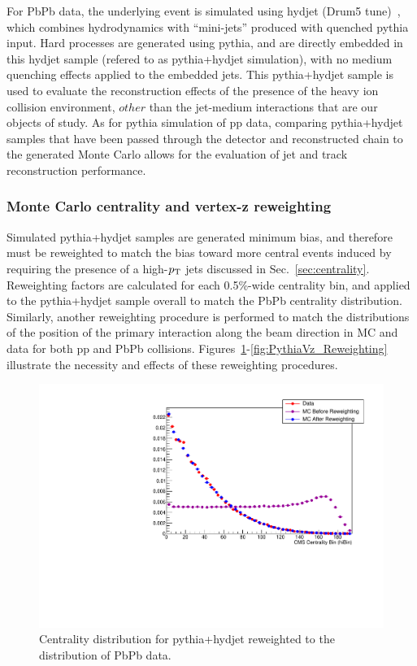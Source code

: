 For PbPb data, the underlying event is simulated using {\sc hydjet} (Drum5 tune)~\cite{Lokhtin:2005px}, which combines hydrodynamics with ``mini-jets''  produced with quenched {\sc pythia} input.  Hard processes are generated using {\sc pythia}, and are directly embedded in this {\sc hydjet} sample (refered to as {\sc pythia+hydjet} simulation), with no medium quenching effects applied to the embedded jets.  This {\sc pythia+hydjet} sample is used to evaluate the reconstruction effects of the presence of the heavy ion collision environment, $other$ than the jet-medium interactions that are our objects of study.  As for {\sc pythia} simulation of pp data, comparing {\sc pythia+hydjet} samples that have been passed through the detector and reconstructed chain to the generated Monte Carlo allows for the evaluation of jet and track reconstruction performance.  


\subsubsection{Monte Carlo centrality and vertex-z reweighting}

Simulated {\sc pythia+hydjet} samples are generated minimum bias, and therefore must be reweighted to match the bias toward more central events induced by requiring the presence of a high-$p_{\rm T}$ jets discussed in Sec.~\ref{sec:centrality}.  Reweighting factors are calculated for each 0.5\%-wide centrality bin, and applied to the {\sc pythia+hydjet} sample overall to match the PbPb centrality distribution.  Similarly, another reweighting procedure is performed to match the distributions of the position of the primary interaction along the beam direction in MC and data for both pp and PbPb collisions.  Figures~\ref{fig:HydCent_Reweighting}-\ref{fig:PythiaVz_Reweighting} illustrate the necessity and effects of these reweighting procedures.  


\begin{figure}[ht]
\begin {center}
  \includegraphics[width=0.58\linewidth]{figures/Samples/HydjetCentralityReweighting.pdf}
  \caption{
    Centrality distribution for {\sc pythia+hydjet} reweighted to the distribution of PbPb data.
  }
\label{fig:HydCent_Reweighting}
\end{center}
\end{figure}



